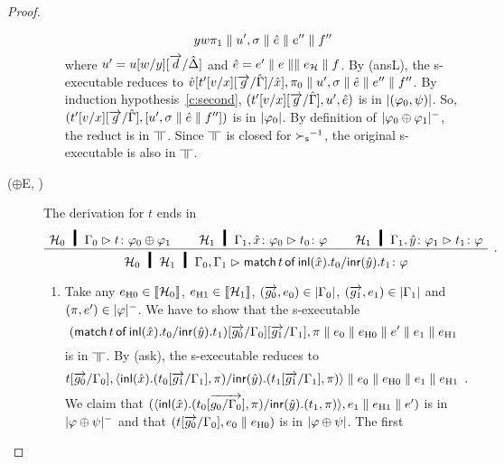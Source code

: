 \begin{proof}
\begin{description}
\begin{enumerate}[label=\textit{(\arabic{*})}]
\[{              y}w{\pi_1}\parallel
              u',\sigma\parallel
              \hat e\parallel e''\parallel f''
              \]
              where
              $u' = u[w/y][\overrightarrow d/\hat{\Delta}]$ and $\hat e=e'\parallel  e\parallel
	      \parallel e_{\mathcal H} \parallel
              f$.
              By (ansL), the s-executable reduces to
              $\hat v[t'[v/x][\overrightarrow g/\hat{\Gamma}]/\hat x],\pi_0 \parallel
              u',\sigma\parallel
              \hat e\parallel e''\parallel f''
              $.
              By induction hypothesis~\ref{c:second},
              $(t'[v/x][\overrightarrow g/\hat {\Gamma}], u', \hat e)$ is in
              $|{(\varphi_0,\psi)}|$.
              So, $(t'[v/x][\overrightarrow g/\hat{\Gamma}], [u',\sigma\parallel \hat e\parallel
              f''])$ is in $|{\varphi_0}|$.
              By definition of $|{\varphi_0\oplus\varphi_1}|^-$,
              the reduct is in $\bbot$.
              Since $\bbot$ is closed for ${\succ_{\mathsf s}}^{-1}$,
              the original s-executable is also in $\bbot$.
       \end{enumerate}
   \item[($\oplus$E, \textminus)]
       The derivation for $t$ ends in
       \[
       \aseq{\hyp{_0}\G_0}{\tj{t}{\phi_0\oplus\phi_1}}
       \aseq{\hyp{_1}\G_1,\tj{\hat{x}}{\phi_0}}{\tj{t_0}{\phi}}
       \aseq{\hyp{_1}\G_1,\tj{\hat{y}}{\phi_1}}{\tj{t_1}{\phi}}
       \tseq{\hyp{_0}\hyp{_1}\G_0,\G_1}{\tj{\mat{t}{\hat x}{t_0}{\hat
	y}{t_1}}{\phi}}
       \DisplayProof\enspace.
       \]
       \begin{enumerate}[label=\textit{(\arabic{*})}]
        \item Take any
	      $e_{\mathrm{H0}}\in\llbracket{\mathcal H_0}\rrbracket$,
	      $e_{\mathrm{H1}}\in\llbracket{\mathcal H_1}\rrbracket$,
	      $(\overrightarrow{g_0},{e_0})\in|{\Gamma_0}|$,\quad
              $(\overrightarrow{g_1},{e_1})\in|{\Gamma_1}|$
              and
              $(\pi,e')\in|{\varphi}|^-$.
              We have to show that the s-executable
              \[
              (\mathsf{match}\,{t}\,\mathsf{of}\, \mathsf{inl}({\hat{x}}). {t_0}/ \mathsf{inr}({\hat{y}}). {t_1})[\overrightarrow{ g_0}/\Gamma_0][\overrightarrow{g_1}/\Gamma_1],
              \pi\parallel {e_0\parallel e_{\mathrm{H0}}}\parallel e'\parallel {e_1\parallel e_{\mathrm{H1}}}
              \]
              is in $\bbot$.
              By (ask), the s-executable reduces to
              \[
               t[\overrightarrow{g_0}/\Gamma_0],
              \langle \mathsf{inl}({\hat{x}}). ({t_0[\overrightarrow{g_1}/\Gamma_1]},{\pi})/ \mathsf{inr}({\hat{y}}). ({t_1[\overrightarrow{g_1}/\Gamma_1]},{\pi})\rangle\parallel{e_0\parallel e_{\mathrm{H0}}}\parallel
              {e_1\parallel e_{\mathrm{H1}}}\enspace.
              \]
              We claim that
              $(\langle \mathsf{inl}({\hat{x}}). ({t_0[\overrightarrow{g_0/\Gamma_0}]},{\pi})/ \mathsf{inr}({\hat{y}}). ({t_1},{\pi})\rangle,{e_1\parallel
              e_{\mathrm{H1}}}\parallel
              e')$ is in $|{\varphi\oplus\psi}|^-$ and that
              $(t[\overrightarrow{g_0}/\Gamma_0],{e_0\parallel e_{\mathrm{H0}}})$ is in $|{\varphi\oplus\psi}|$.  The first

\end{enumerate}
\end{description}
\end{proof}
